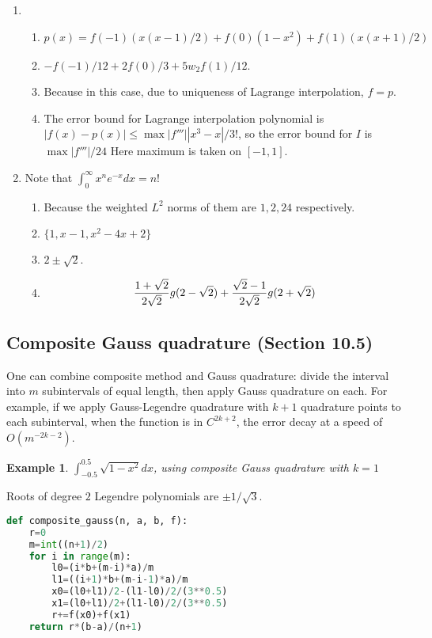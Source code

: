 \documentclass{article} %
\theoremstyle{break}
\newtheorem{exa}[definition]{Example}
\begin{document}
\begin{enumerate}
\item
 \begin{enumerate}
  \item $p(x)=f(-1)(x(x-1)/2)+f(0)(1-x^2)+f(1)(x(x+1)/2)$
  \item $-f(-1)/12+2f(0)/3+5w_2f(1)/12$.
\item Because in this case, due to uniqueness of Lagrange interpolation, $f=p$.
  \item The error bound for Lagrange interpolation polynomial is $|f(x)-p(x)|\leq\max|f'''||x^3-x|/3!$, so the error bound for $I$ is $\max|f'''|/24$ Here maximum is taken on $[-1, 1]$.
  \end{enumerate}
 
\item Note that $\int_0^\infty x^ne^{-x}dx=n!$
\begin{enumerate}
    \item Because the weighted $L^2$ norms of them are $1, 2, 24$ respectively.
     \item $\{1, x-1, x^2-4x+2\}$
\item $2\pm\sqrt{2}$.
\item \[{1+\sqrt{2}\over 2\sqrt{2}}g(2-\sqrt{2})+{\sqrt{2}-1\over 2\sqrt{2}}g(2+\sqrt{2})\]
\end{enumerate}
\end{enumerate}


\subsection{Composite Gauss quadrature (Section 10.5)}

One can combine composite method and Gauss quadrature: divide the interval into $m$ subintervals of equal length, then apply Gauss quadrature on each. For example, if we apply Gauss-Legendre quadrature with $k+1$ quadrature points to each subinterval, when the function is in $C^{2k+2}$, the error decay at a speed of $O(m^{-2k-2})$.


\begin{exa} $\int_{-0.5}^{0.5}\sqrt{1-x^2}dx$, using composite Gauss quadrature with $k=1$\end{exa}

Roots of degree $2$ Legendre polynomials are $\pm1/\sqrt{3}$.

\begin{lstlisting}[language=Python]
def composite_gauss(n, a, b, f):
    r=0
    m=int((n+1)/2)
    for i in range(m):
        l0=(i*b+(m-i)*a)/m
        l1=((i+1)*b+(m-i-1)*a)/m
        x0=(l0+l1)/2-(l1-l0)/2/(3**0.5)
        x1=(l0+l1)/2+(l1-l0)/2/(3**0.5)
        r+=f(x0)+f(x1)
    return r*(b-a)/(n+1)
\end{lstlisting}
\end{document}
